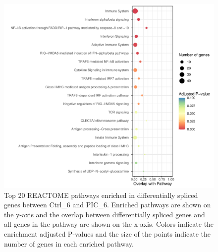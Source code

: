 \begin{figure}[H]
  \centering
  \includegraphics[width=\textwidth]{ds_PIC_6_vs_Ctrl_6}
  \caption{Top 20 REACTOME pathways enriched in differentially spliced genes between Ctrl\_6 and PIC\_6. Enriched pathways are shown on the y-axis and the overlap between differentially spliced genes and all genes in the pathway are shown on the x-axis. Colors indicate the enrichment adjusted P-values and the size of the points indicate the number of genes in each enriched pathway.}
  \label{fig:ds_PIC_6_vs_Ctrl_6}   
\end{figure}

